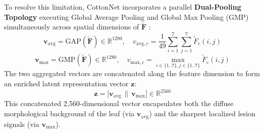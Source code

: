 \documentclass[journal,10pt,twocolumn]{IEEEtran}
\begin{document}
To resolve this limitation, CottonNet incorporates a parallel \textbf{Dual-Pooling Topology} executing Global Average Pooling and Global Max Pooling (GMP) simultaneously across spatial dimensions of $\widetilde{\mathbf{F}}$ \cite{woo2018cbam}:
\begin{equation}
\mathbf{v}_{\text{avg}} = \text{GAP}(\widetilde{\mathbf{F}}) \in \mathbb{R}^{1280}, \quad v_{\text{avg}, c} = \frac{1}{49} \sum_{i=1}^7 \sum_{j=1}^7 \widetilde{F}_c(i, j)
\end{equation}
\begin{equation}
\mathbf{v}_{\text{max}} = \text{GMP}(\widetilde{\mathbf{F}}) \in \mathbb{R}^{1280}, \quad v_{\text{max}, c} = \max_{i \in \{1..7\}, j \in \{1..7\}} \widetilde{F}_c(i, j)
\end{equation}
The two aggregated vectors are concatenated along the feature dimension to form an enriched latent representation vector $\mathbf{z}$:
\begin{equation}
\mathbf{z} = \Big[ \mathbf{v}_{\text{avg}} \,\|\, \mathbf{v}_{\text{max}} \Big] \in \mathbb{R}^{2560}
\end{equation}
This concatenated 2,560-dimensional vector encapsulates both the diffuse morphological background of the leaf (via $\mathbf{v}_{\text{avg}}$) and the sharpest localized lesion signals (via $\mathbf{v}_{\text{max}}$).
\end{document}

